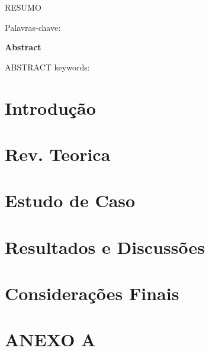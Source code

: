 \documentclass[12pt,a4paper,header, times]{abnt}
\begin{document}
\begin{resumo}

RESUMO

\vspace{1cm}
\noindent Palavras-chave: 

\vspace{1cm}
\begin{center}
\textbf{{\normalsize Abstract}}
\end{center}
ABSTRACT
\vspace{1cm}
\noindent keywords: 

\end{resumo}






\begingroup
\let\clearpage\relax




\chapter{Introdução} \label{cap:introducao}


\chapter{Rev. Teorica}


\chapter{Estudo de Caso}


\chapter{Resultados e Discussões}


\chapter{Considerações Finais}







\chapter{ANEXO A}


\endgroup
\end{document}
